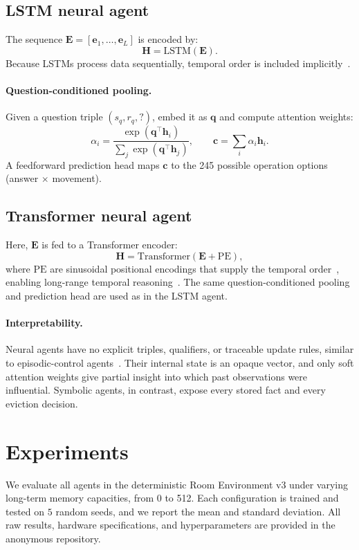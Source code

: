 \documentclass[11pt]{article}
\begin{document}
\subsection*{LSTM neural agent}
The sequence $\mathbf{E}=[\mathbf{e}_1,\dots,\mathbf{e}_L]$ is encoded by:
\[
\mathbf{H} = \text{LSTM}(\mathbf{E}).
\]
Because LSTMs process data sequentially, temporal order is included
implicitly~\cite{6795963}.

\paragraph{Question-conditioned pooling.}
Given a question triple $(s_q,r_q,?)$, embed it as $\mathbf{q}$ and compute
attention weights:
\[
\alpha_i = \frac{\exp(\mathbf{q}^\top \mathbf{h}_i)}
{\sum_j \exp(\mathbf{q}^\top \mathbf{h}_j)},\qquad
\mathbf{c} = \sum_i \alpha_i \mathbf{h}_i.
\]
A feedforward prediction head maps $\mathbf{c}$ to the 245 possible
operation options (answer $\times$ movement).

\subsection*{Transformer neural agent}
Here, $\mathbf{E}$ is fed to a Transformer encoder:
\[
\mathbf{H} = \text{Transformer}(\mathbf{E} + \mathrm{PE}),
\]
where $\mathrm{PE}$ are sinusoidal positional encodings that supply the
temporal order~\cite{vaswani2023attentionneed}, enabling long-range temporal reasoning~\cite{dehghani2019universaltransformers}. The same question-conditioned pooling and prediction head
are used as in the LSTM agent.

\paragraph{Interpretability.}
Neural agents have no explicit triples, qualifiers, or traceable update
rules, similar to episodic-control agents~\cite{pritzel2017neuralepisodiccontrol,blundell2016modelfreeepisodiccontrol}. Their internal state is an opaque vector, and only soft attention
weights give partial insight into which past observations were influential.
Symbolic agents, in contrast, expose every stored fact and every eviction
decision.


\section{Experiments}

We evaluate all agents in the deterministic Room Environment v3 under varying long-term memory capacities, from 0 to 512. Each configuration is trained and tested on $5$ random seeds, and we report the mean and standard deviation. All raw results, hardware specifications, and hyperparameters are provided in the anonymous repository.
\end{document}
